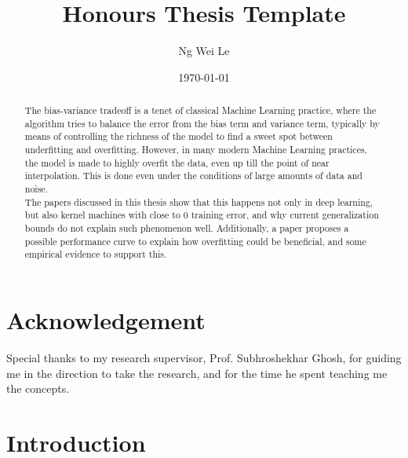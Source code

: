 \documentclass[twoside]{memoir}
\title{Honours Thesis Template}
\author{Ng Wei Le}
\date{\today}
\begin{document}
	\frontmatter
	
	
\maketitle

\chapter{Acknowledgement}
Special thanks to my research supervisor, Prof. Subhroshekhar Ghosh, for guiding me in the direction to take the research, and for the time he spent teaching me the concepts.
	
\begin{abstract}
	The bias-variance tradeoff is a tenet of classical Machine Learning practice, where the algorithm tries to balance the error from the bias term and variance term, typically by means of controlling the richness of the model to find a sweet spot between underfitting and overfitting. However, in many modern Machine Learning practices, the model is made to highly overfit the data, even up till the point of near interpolation. This is done even under the conditions of large amounts of data and noise.\\
	The papers discussed in this thesis show that this happens not only in deep learning, but also kernel machines with close to 0 training error, and why current generalization bounds do not explain such phenomenon well. Additionally, a paper proposes a possible performance curve to explain how overfitting could be beneficial, and some empirical evidence to support this.
\end{abstract}
	
\tableofcontents

\listoffigures*

\mainmatter

\chapter{Introduction}
\end{document}
